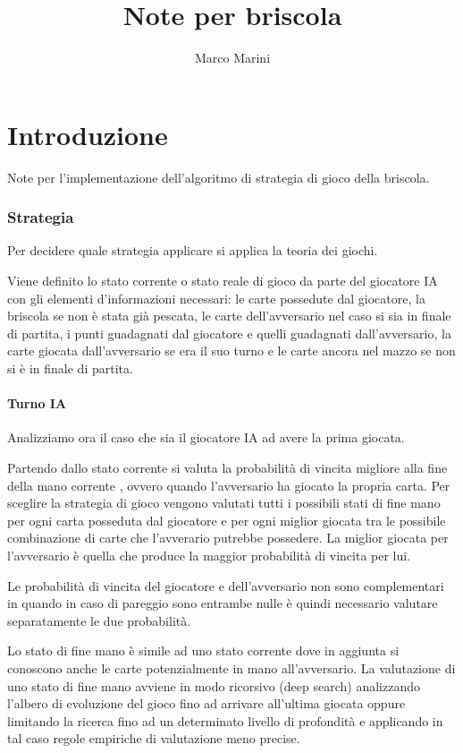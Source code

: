 \documentclass[a4paper,11pt]{article}
\begin{document}
\title{Note per briscola}
\author{Marco Marini}
\maketitle
\tableofcontents
\part{Introduzione}
Note per l'implementazione dell'algoritmo di strategia di gioco della briscola.

\section{Strategia}

Per decidere quale strategia applicare si applica la teoria dei giochi.

Viene definito lo stato corrente  o stato reale di gioco da parte del
giocatore IA con gli elementi d'informazioni necessari:
le carte possedute dal giocatore, la briscola se non è stata già pescata, le carte dell'avversario nel
caso si sia in finale di partita,
i punti guadagnati dal giocatore e quelli guadagnati dall'avversario, la carte giocata dall'avversario
se era il suo turno e le carte ancora nel mazzo se non si è in finale di partita.

\subsection{Turno IA}
Analizziamo ora il caso che sia il giocatore IA ad avere la prima giocata. 

Partendo dallo stato corrente si valuta la probabilità di vincita migliore alla fine della mano corrente
, ovvero quando l'avversario ha giocato la propria carta.
Per sceglire la strategia di gioco vengono valutati tutti i possibili stati di fine mano per ogni carta
posseduta dal giocatore e per ogni miglior giocata tra le possibile combinazione di carte che
l'avverario putrebbe possedere.
La miglior giocata per l'avversario è quella che produce la maggior probabilità di vincita per lui.

Le probabilità di vincita del giocatore e dell'avversario non sono complementari
 in quando in caso di pareggio sono entrambe nulle
è quindi necessario valutare separatamente le due probabilità.

Lo stato di fine mano è simile ad uno stato corrente  dove in aggiunta
si conoscono anche  le carte potenzialmente in mano all'avversario.
La valutazione di uno stato di fine mano avviene in modo ricorsivo (deep search) analizzando
l'albero di evoluzione del gioco 
fino ad arrivare all'ultima giocata oppure limitando la ricerca fino ad un determinato livello
di profondità e applicando
in tal caso regole empiriche di valutazione meno precise.
\end{document}
